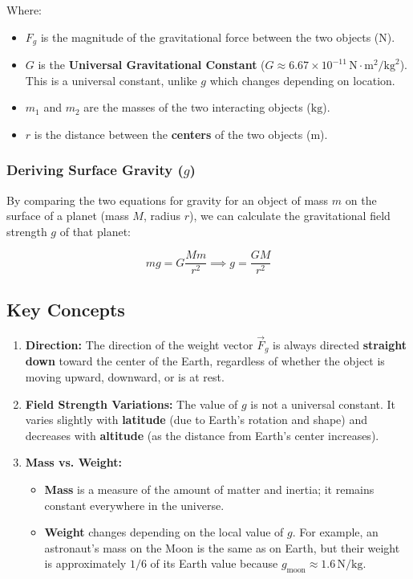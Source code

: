 \documentclass{article}
\begin{document}
Where:
\begin{itemize}
    \item $F_g$ is the magnitude of the gravitational force between the two objects ($\text{N}$).
    \item $G$ is the \textbf{Universal Gravitational Constant} ($G \approx 6.67 \times 10^{-11}\,\text{N}\cdot\text{m}^2/\text{kg}^2$). This is a universal constant, unlike $g$ which changes depending on location.
    \item $m_1$ and $m_2$ are the masses of the two interacting objects ($\text{kg}$).
    \item $r$ is the distance between the \textbf{centers} of the two objects ($\text{m}$).
\end{itemize}

\subsubsection{Deriving Surface Gravity ($g$)}
By comparing the two equations for gravity for an object of mass $m$ on the surface of a planet (mass $M$, radius $r$), we can calculate the gravitational field strength $g$ of that planet:

\begin{equation}
mg = G \frac{Mm}{r^2} \implies g = \frac{GM}{r^2}
\end{equation}

\subsection{Key Concepts}
\begin{enumerate}
    \item \textbf{Direction:} The direction of the weight vector $\vec{F}_g$ is always directed \textbf{straight down} toward the center of the Earth, regardless of whether the object is moving upward, downward, or is at rest.
    \item \textbf{Field Strength Variations:} The value of $g$ is not a universal constant. It varies slightly with \textbf{latitude} (due to Earth's rotation and shape) and decreases with \textbf{altitude} (as the distance from Earth's center increases).
    \item \textbf{Mass vs. Weight:} 
    \begin{itemize}
        \item \textbf{Mass} is a measure of the amount of matter and inertia; it remains constant everywhere in the universe.
        \item \textbf{Weight} changes depending on the local value of $g$. For example, an astronaut's mass on the Moon is the same as on Earth, but their weight is approximately $1/6$ of its Earth value because $g_{\text{moon}} \approx 1.6\,\text{N/kg}$.
    \end{itemize}
\end{enumerate}
\end{document}
